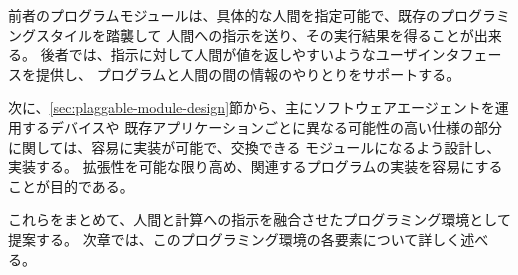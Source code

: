 前者のプログラムモジュールは、具体的な人間を指定可能で、既存のプログラミングスタイルを踏襲して
人間への指示を送り、その実行結果を得ることが出来る。
後者では、指示に対して人間が値を返しやすいようなユーザインタフェースを提供し、
プログラムと人間の間の情報のやりとりをサポートする。

次に、\ref{sec:plaggable-module-design}節から、主にソフトウェアエージェントを運用するデバイスや
既存アプリケーションごとに異なる可能性の高い仕様の部分に関しては、容易に実装が可能で、交換できる
モジュールになるよう設計し、実装する。
拡張性を可能な限り高め、関連するプログラムの実装を容易にすることが目的である。

これらをまとめて、人間と計算への指示を融合させたプログラミング環境として提案する。
次章では、このプログラミング環境の各要素について詳しく述べる。
